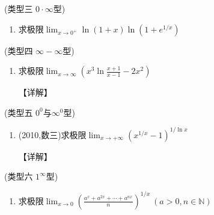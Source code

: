 \documentclass[12pt, a4paper, oneside, UTF8]{ctexbook}
\begin{document}
\begin{remark}(类型三 $0\cdot\infty$型)
\end{remark}

\begin{enumerate}[label=\arabic*.,start=7]
    \item  求极限$\lim_{x\to0^+}\ln(1+x)\ln\left(1+e^{1/x}\right)$
    
    \begin{solution}
    
    \end{solution}
\end{enumerate}

\begin{remark}(类型四 $\infty-\infty$型)
\end{remark}

\begin{enumerate}[label=\arabic*.,start=8]
    \item  求极限$\lim_{x\to\infty}\left(x^3\ln\frac{x+1}{x-1}-2x^2\right)$
    
    \begin{solution}
    【详解】
    \end{solution}
\end{enumerate}

\begin{remark}(类型五 $0^0$与$\infty^0$型)
\end{remark}

\begin{enumerate}[label=\arabic*.,start=9]
    \item  (2010,数三)求极限$\lim_{x\to+\infty}\left(x^{1/x}-1\right)^{1/\ln x}$
    
    \begin{solution}
    【详解】
    \end{solution}
\end{enumerate}

\begin{remark}(类型六 $1^\infty$型)
\end{remark}

\begin{enumerate}[label=\arabic*.,start=10]
    \item  求极限$\lim_{x\to0}\left(\frac{a^x+a^{2x}+\cdots+a^{nx}}{n}\right)^{1/x}\ (a>0,n\in\mathbb{N})$
    
    \begin{solution}
    
    \end{solution}
\end{enumerate}
\end{document}
